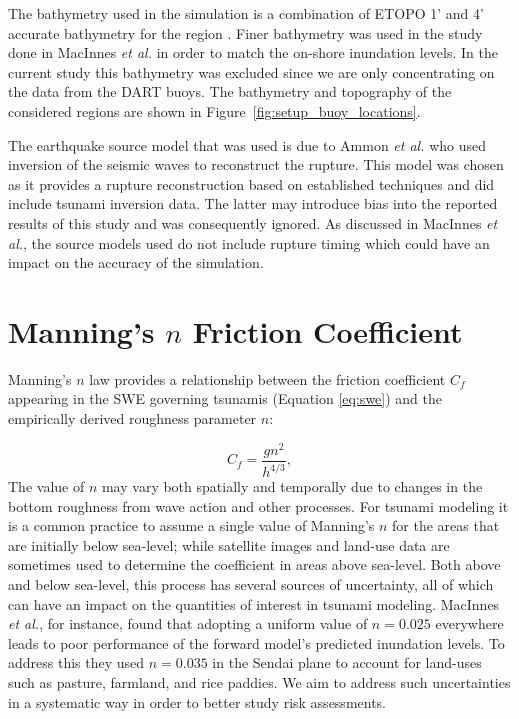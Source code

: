 \documentclass[review,12pt]{elsarticle}
\begin{document}
The bathymetry used in the simulation is a combination of ETOPO 1' and 4'
accurate bathymetry for the region \cite{Amante:2009ud}.  Finer bathymetry was
used in the study done in MacInnes \emph{et al.} in order to match the on-shore
inundation levels.  In the current study this bathymetry was excluded since we
are only concentrating on the data from the DART buoys. The bathymetry and 
topography of the considered regions are shown in Figure~\ref{fig:setup_buoy_locations}.

The earthquake source model that was used is due to Ammon \emph{et al.}
\cite{Ammon:2011dm} who used inversion of the seismic waves to reconstruct the
rupture.  This model was chosen as it provides a rupture reconstruction based on
established techniques and did include tsunami inversion data.  The
latter may introduce bias into the reported results of this study and was consequently ignored.
As discussed in MacInnes \emph{et al.}, the source models used do not include
rupture timing which could have an impact on the accuracy of the simulation.


\section{Manning's $n$ Friction Coefficient} \label{sec:manning}

Manning's $n$ law provides a relationship between the friction coefficient
$C_f$ appearing in the SWE governing tsunamis (Equation \ref{eq:swe}) and 
the empirically derived roughness parameter $n$:

\begin{equation}
    C_f = \frac{g n^2}{h^{4/3}},
\label{eq:coef}
\end{equation}
The value of $n$ may vary both spatially and temporally due to changes in the
bottom roughness from wave action and other processes.  For tsunami modeling it
is a common practice to assume a single value of Manning's $n$ for the areas
that are initially below sea-level; while satellite images and 
land-use data are sometimes used to determine the coefficient in areas above sea-level.  
Both above and below sea-level, this process has several sources of uncertainty, all
of which can have an impact on the quantities of interest in tsunami modeling.   
MacInnes \emph{et al.}, for instance, found that adopting a uniform value 
of $n = 0.025$ everywhere leads to poor performance of the forward model's predicted 
inundation levels.  To address this they used $n = 0.035$ in the Sendai plane to 
account for land-uses such as pasture, farmland, and rice paddies.  We aim to address such
uncertainties in a systematic way in order to better study risk assessments.
\end{document}
